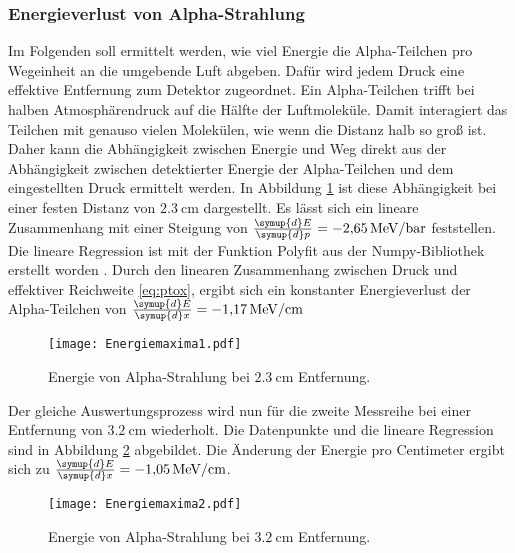 \subsubsection{Energieverlust von Alpha-Strahlung}
Im Folgenden soll ermittelt werden, wie viel Energie die Alpha-Teilchen pro Wegeinheit
an die umgebende Luft abgeben. Dafür wird jedem Druck eine effektive Entfernung zum Detektor zugeordnet.
Ein Alpha-Teilchen trifft bei halben Atmosphärendruck auf die Hälfte der Luftmoleküle. Damit interagiert
das Teilchen mit genauso vielen Molekülen, wie wenn die Distanz halb so groß ist.
Daher kann die Abhängigkeit zwischen Energie und Weg direkt aus der Abhängigkeit zwischen detektierter Energie
der Alpha-Teilchen und dem eingestellten Druck ermittelt werden.
In Abbildung \ref{fig:Energie1} ist diese Abhängigkeit bei einer festen Distanz von $\qty{2.3}{\centi\meter}$ 
dargestellt. Es lässt sich ein lineare Zusammenhang mit einer Steigung von $\frac{\symup{d}E}{\symup{d}p}=\qty{-2.65}{\mega\electronvolt\per\bar}$
feststellen. Die lineare Regression ist mit der Funktion Polyfit aus der Numpy-Bibliothek erstellt worden \cite{numpy}.
Durch den linearen Zusammenhang zwischen Druck und effektiver Reichweite \eqref{eq:ptox}, ergibt sich ein konstanter Energieverlust der Alpha-Teilchen
von $\frac{\symup{d}E}{\symup{d}x}=\qty{-1.17}{\mega\electronvolt\per\centi\meter}$
\begin{figure}[H]
  \centering
  \texttt{[image: Energiemaxima1.pdf]}
  \caption{Energie von Alpha-Strahlung bei $\qty{2.3}{\centi\meter}$ Entfernung.}
  \label{fig:Energie1}
\end{figure}
\noindent Der gleiche Auswertungsprozess wird nun für die zweite Messreihe bei einer Entfernung von $\qty{3.2}{\centi\meter}$
wiederholt. Die Datenpunkte und die lineare Regression sind in Abbildung \ref{fig:Energie2} abgebildet.
Die Änderung der Energie pro Centimeter ergibt sich zu $\frac{\symup{d}E}{\symup{d}x}=\qty{-1.05}{\mega\electronvolt\per\centi\meter}$.

\begin{figure}[H]
  \centering
  \texttt{[image: Energiemaxima2.pdf]}
  \caption{Energie von Alpha-Strahlung bei $\qty{3.2}{\centi\meter}$ Entfernung.}
  \label{fig:Energie2}
\end{figure}

